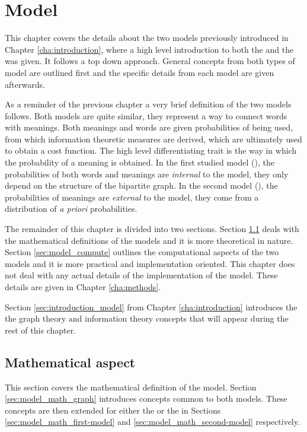 \chapter{Model}
\label{cha:model}


This chapter covers the details about the two models previously introduced in Chapter \ref{cha:introduction}, where a high level introduction to both the \firstmodel{} and the \secondmodel{} was given.
It follows a top down approach.
General concepts from both types of model are outlined first and the specific details from each model are given afterwards.

As a reminder of the previous chapter a very brief definition of the two models follows.
Both models are quite similar, they represent a way to connect words with meanings.
Both meanings and words are given probabilities of being used, from which information theoretic measures are derived, which are ultimately used to obtain a cost function.
The high level differentiating trait is the way in which the probability of a meaning is obtained.
In the first studied model (\firstmodel{}), the probabilities of both words and meanings are \emph{internal} to the model, they only depend on the structure of the bipartite graph.
In the second model (\secondmodel{}), the probabilities of meanings are \emph{external} to the model, they come from a distribution of \emph{a priori} probabilities.

The remainder of this chapter is divided into two sections.
Section \ref{sec:model_math} deals with the mathematical definitions of the models and it is more theoretical in nature.
Section \ref{sec:model_compute} outlines the computational aspects of the two models and it is more practical and implementation oriented.
This chapter does not deal with any actual details of the implementation of the model.
These details are given in Chapter \ref{cha:methods}.

Section \ref{sec:introduction_model} from Chapter \ref{cha:introduction} introduces the  the graph theory and information theory concepts that will appear during the rest of this chapter.

\section{Mathematical aspect}
\label{sec:model_math}

This section covers the mathematical definition of the model.
Section \ref{sec:model_math_graph} introduces concepts common to both models.
These concepts are then extended for either the \firstmodel{} or the \secondmodel{} in Sections \ref{sec:model_math_first-model} and \ref{sec:model_math_second-model} respectively.

